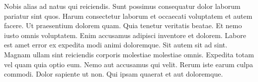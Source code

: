 Nobis alias ad natus qui reiciendis. Sunt possimus consequatur dolor laborum pariatur sint quos. Harum consectetur laborum et occaecati voluptatem et autem facere. Ut praesentium dolorem quam. Quia tenetur veritatis beatae. Et nemo iusto omnis voluptatem. Enim accusamus adipisci inventore et dolorem. Labore est amet error ex expedita modi animi doloremque. Sit autem sit ad sint. Magnam ullam sint reiciendis corporis molestiae molestiae omnis. Expedita totam vel quam quia optio eum. Nemo aut accusamus qui velit. Rerum iste earum culpa commodi. Dolor sapiente ut non. Qui ipsam quaerat et aut doloremque.
